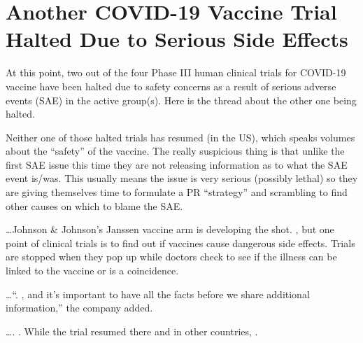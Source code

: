 \chapter{Another COVID-19 Vaccine Trial Halted Due to Serious Side Effects}

\begin{refsection}

At this point, two out of the four Phase III human clinical trials for COVID-19 vaccine have been halted due to safety concerns as a result of serious adverse events (SAE) in the active group(s). Here is the thread about the other one being halted.\textsuperscript{\cite{url43235527}}

Neither one of those halted trials has resumed (in the US), which speaks volumes about the \enquote{safety} of the vaccine. The really suspicious thing is that unlike the first SAE issue this time they are not releasing information as to what the SAE event is/was. This usually means the issue is very serious (possibly lethal) so they are giving themselves time to formulate a PR \enquote{strategy} and scrambling to find other causes on which to blame the SAE.

\begin{tcolorbox}[quote]

\dots{}Johnson \& Johnson's Janssen vaccine arm is developing the shot. , but one point of clinical trials is to find out if vaccines cause dangerous side effects. Trials are stopped when they pop up while doctors check to see if the illness can be linked to the vaccine or is a coincidence.\textsuperscript{\cite{urla887dece}}

\end{tcolorbox}

\begin{tcolorbox}[quote]

\dots{}\enquote{. , and it's important to have all the facts before we share additional information,} the company added.\textsuperscript{\cite{urla887dece}}

\end{tcolorbox}

\begin{tcolorbox}[quote]

\dots{}. . While the trial resumed there and in other countries, .\textsuperscript{\cite{urla887dece}}

\end{tcolorbox}

\printbibliography[heading=subbibliography]

\end{refsection}